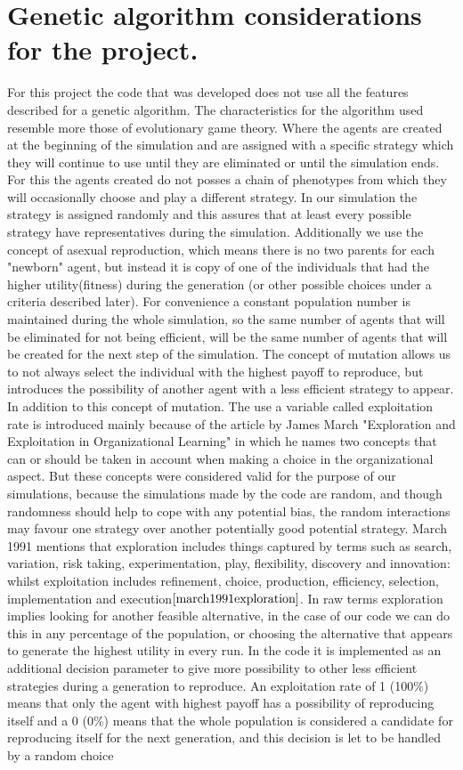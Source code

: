 \section{Genetic algorithm considerations for the project.}
For this project the code that was developed does not use all the features described for a genetic algorithm. The characteristics for the algorithm used resemble more those of evolutionary game theory. Where the agents are created at the beginning of the simulation and are assigned with a specific strategy which they will continue to use until they are eliminated or until the simulation ends. For this the agents created do not posses a chain of phenotypes from which they will occasionally choose and play a different strategy. In our simulation the strategy is assigned randomly and this assures that at least every possible strategy have representatives during the simulation. Additionally we use the concept of asexual reproduction, which means there is no two parents for each "newborn" agent, but instead it is copy of one of the individuals that had the higher utility(fitness) during the generation (or other possible choices under a criteria described later). For convenience a constant population number is maintained during the whole simulation, so the same number of agents that will be eliminated for not being efficient, will be the same number of agents that will be created for the next step of the simulation. The concept of mutation allows us to not always select the individual with the highest payoff to reproduce, but introduces the possibility of another agent with a less efficient strategy to appear. In addition to this concept of mutation. The use a variable called exploitation rate is introduced mainly because of the article by James March "Exploration and Exploitation in Organizational Learning" in which he names two concepts that can or should be taken in account when making a choice in the organizational aspect. But these concepts were considered valid for the purpose of our simulations, because the simulations made by the code are random, and though randomness should help to cope with any potential bias, the random interactions may favour one strategy over another potentially good potential strategy. March 1991 mentions that exploration includes things captured by terms such as search, variation, risk taking, experimentation, play, flexibility, discovery and innovation: whilst exploitation includes refinement, choice, production, efficiency, selection, implementation and execution$\cite{march1991exploration}$. In raw terms exploration implies looking for another feasible alternative, in the case of our code we can do this in any percentage of the population, or choosing the alternative that appears to generate the highest utility in every run. In the code it is implemented as  an additional decision parameter to give more possibility to other less efficient strategies during a generation to reproduce. An exploitation rate of 1 (100\%) means that only the agent with highest payoff has a possibility of reproducing itself and a 0 (0\%) means that the whole population is considered a candidate for reproducing itself for the next generation, and this decision is let to be handled by a random choice 